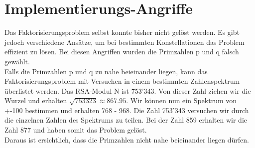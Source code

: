 \section{Implementierungs-Angriffe}
Das Faktorisierungsproblem selbst konnte bisher nicht gelöst werden. Es gibt jedoch verschiedene Ansätze, um bei bestimmten Konstellationen das Problem effizient zu lösen. Bei diesen Angriffen wurden die Primzahlen p und q falsch gewählt.\\
Falls die Primzahlen p und q zu nahe beieinander liegen, kann das Faktorisierungsproblem mit Versuchen in einem bestimmten Zahlenspektrum überlistet werden. Das RSA-Modul N ist 753'343. Von dieser Zahl ziehen wir die Wurzel und erhalten $ \sqrt{753323} \approx 867.95 $. Wir können nun ein Spektrum von +-100 bestimmen und erhalten 768 - 968. Die Zahl 753'343 versuchen wir durch die einzelnen Zahlen des Spektrums zu teilen. Bei der Zahl 859 erhalten wir die Zahl 877 und haben somit das Problem gelöst.\\
Daraus ist ersichtlich, dass die Primzahlen nicht nahe beieinander liegen dürfen.%
%
